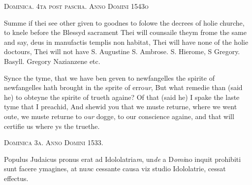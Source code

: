 \documentclass[12pt, a4paper]{book}
\begin{document}
 

               
                  
				\begin{center}  {\scshape Dominica. 4ta post pascha. Anno Domini 1543o}  \end{center}
			

				\marginpar[\vspace{0.5cm}{\textcolor{Gray}{sclanderous}}]{}
			
		\ifthenelse{\isodd{\thepage}}
		{\reversemarginpar}
		{\normalmarginpar}
		Summe if thei see other given to goodnes to folowe the decrees
 of holie churche, to knele before the Blessyd sacrament
 Thei will counsaile theym frome the same and say, deus
 in manufactis templis non habitat, Thei will have none
 of the holie doctours, Thei will not have S. Augustine
 S. Ambrose. S. Hierome, S Gregory. Basyll. Gregory
 Nazianzene etc.

	
				\marginpar[\vspace{0.5cm}{\textcolor{Gray}{n}}]{}
			
	
		\ifthenelse{\isodd{\thepage}}
		{\reversemarginpar}
		{\normalmarginpar}
		Synce the tyme, that we have ben geven to newfangelles
 the spirite of newfangelles hath brought in the sprite of
 erro\textit{ur}, But what remedie than (said he) to obteyne the
 spirite of trueth againe? Of that (said he) I spake the
 laste tyme that I preachid, And shewid you that we muste
 returne, where we went oute, we muste returne to o\textit{ur }dogge,
 to our conscience againe, and that will certifie us where
 ys the truethe.

 

               
                  
				\begin{center}  {\scshape Dominica 3a. Anno Domini 1533.
                  }  \end{center}
			

 
		\ifthenelse{\isodd{\thepage}}
		{\reversemarginpar}
		{\normalmarginpar}
		Populus Judaicus pronus erat ad Idololatria\textit{m}, un\textit{de} a D\textit{omi}no
 inquit prohibiti sunt facere ymagines, at nu\textit{n}c cessante causa
 viz studio Idololatrie, cessat effectus.
 


            
            
\dotfill
						\newpage {} \subsection*{}
\end{document}
